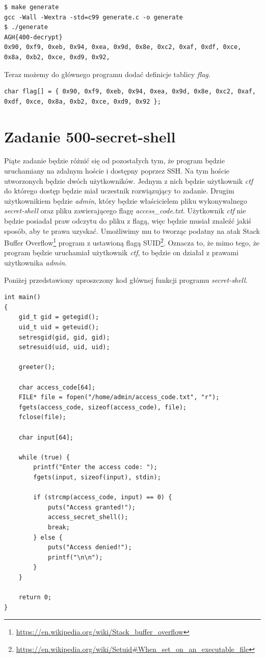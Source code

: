 \documentclass[language=polish,type=eng]{aghmodern}
\begin{document}
\begin{verbatim}
$ make generate
gcc -Wall -Wextra -std=c99 generate.c -o generate
$ ./generate
AGH{400-decrypt}
0x90, 0xf9, 0xeb, 0x94, 0xea, 0x9d, 0x8e, 0xc2, 0xaf, 0xdf, 0xce, 0x8a, 0xb2, 0xce, 0xd9, 0x92,
\end{verbatim}

Teraz możemy do głównego programu dodać definicje tablicy \emph{flag}.

\begin{verbatim}
char flag[] = { 0x90, 0xf9, 0xeb, 0x94, 0xea, 0x9d, 0x8e, 0xc2, 0xaf, 0xdf, 0xce, 0x8a, 0xb2, 0xce, 0xd9, 0x92 };
\end{verbatim}

\section{Zadanie 500-secret-shell}

Piąte zadanie będzie różnić się od pozostałych tym, że program będzie uruchamiany
na zdalnym hoście i dostępny poprzez SSH. Na tym hoście utworzonych będzie dwóch użytkowników.
Jednym z nich będzie użytkownik \emph{ctf} do którego dostęp będzie miał uczestnik rozwiązujący
to zadanie. Drugim użytkownikiem będzie \emph{admin}, który będzie właścicielem pliku
wykonywalnego \emph{secret-shell} oraz pliku zawierającego flagę \emph{access\_code.txt}.
Użytkownik \emph{ctf} nie będzie posiadał praw odczytu do pliku z flagą, więc będzie
musiał znaleźć jakiś sposób, aby te prawa uzyskać. Umożliwimy mu to tworząc podatny
na atak Stack Buffer Overflow\footnote{
\url{https://en.wikipedia.org/wiki/Stack_buffer_overflow}} program z ustawioną flagą SUID\footnote{
\url{https://en.wikipedia.org/wiki/Setuid\#When_set_on_an_executable_file}}.
Oznacza to, że mimo tego, że program będzie uruchamiał użytkownik \emph{ctf}, to będzie on
działał z prawami użytkownika \emph{admin}.

Poniżej przedstawiony uproszczony kod głównej funkcji programu \emph{secret-shell}.

\begin{verbatim}
int main()
{
    gid_t gid = getegid();
    uid_t uid = geteuid();
    setresgid(gid, gid, gid);
    setresuid(uid, uid, uid);

    greeter();

    char access_code[64];
    FILE* file = fopen("/home/admin/access_code.txt", "r");
    fgets(access_code, sizeof(access_code), file);
    fclose(file);

    char input[64];

    while (true) {
        printf("Enter the access code: ");
        fgets(input, sizeof(input), stdin);

        if (strcmp(access_code, input) == 0) {
            puts("Access granted!");
            access_secret_shell();
            break;
        } else {
            puts("Access denied!");
            printf("\n\n");
        }
    }

    return 0;
}
\end{verbatim}
\end{document}
